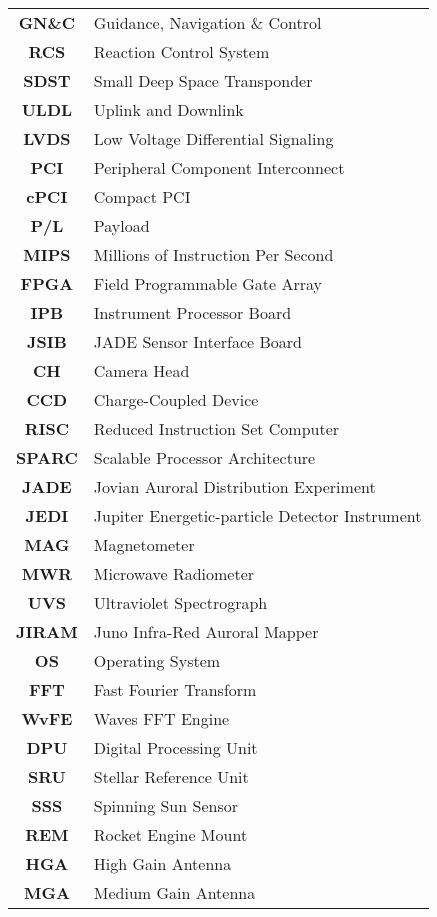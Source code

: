\begin{multicols}{2}
{\begin{xltabular}{\linewidth}{c>{\raggedright\arraybackslash}X}
		\textbf{GN\&C} & Guidance, Navigation \& Control  \\
		\textbf{RCS} & Reaction Control System \\
		\textbf{SDST} & Small Deep Space Transponder \\
		\textbf{ULDL} & Uplink and Downlink \\
		\textbf{LVDS} & Low Voltage Differential Signaling \\
		\textbf{PCI} & Peripheral Component Interconnect \\
		\textbf{cPCI} & Compact PCI \\
		\textbf{P/L} & Payload \\
		\textbf{MIPS} & Millions of Instruction Per Second \\ 
		\textbf{FPGA} & Field Programmable Gate Array \\
		\textbf{IPB} & Instrument Processor Board \\
		\textbf{JSIB} & JADE Sensor Interface Board \\
		\textbf{CH} & Camera Head \\
		\textbf{CCD} & Charge-Coupled Device \\
		\textbf{RISC} & Reduced Instruction Set Computer \\
		\textbf{SPARC} & Scalable Processor Architecture \\
		\textbf{JADE} & Jovian Auroral Distribution Experiment \\
		\textbf{JEDI} & Jupiter Energetic-particle Detector Instrument \\
		\textbf{MAG} & Magnetometer \\
		\textbf{MWR} & Microwave Radiometer \\
		\textbf{UVS} & Ultraviolet Spectrograph \\
		\textbf{JIRAM} & Juno Infra-Red Auroral Mapper \\
		\textbf{OS} & Operating System \\
		\textbf{FFT} & Fast Fourier Transform \\
		\textbf{WvFE} & Waves FFT Engine \\
		\textbf{DPU} & Digital Processing Unit \\
		\textbf{SRU} & Stellar Reference Unit \\
		\textbf{SSS} & Spinning Sun Sensor \\
		\textbf{REM} & Rocket Engine Mount \\
		\textbf{HGA} & High Gain Antenna \\
		\textbf{MGA} & Medium Gain Antenna \\

\end{xltabular}}
\end{multicols}
